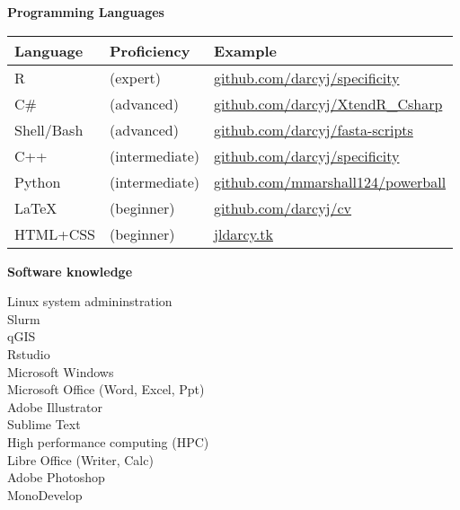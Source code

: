 \documentclass{article}
\begin{document}
{\large  \textbf{Programming Languages}}
\\\begin{tabular}{l l l}
  Language & Proficiency & Example\\
  \hline
  R & (expert) & \href{https://github.com/darcyj/specificity}{github.com/darcyj/specificity}\\
  C\# & (advanced) & \href{https://github.com/darcyj/XtendR_Csharp}{github.com/darcyj/XtendR\_Csharp}\\
  Shell/Bash & (advanced) & \href{https://github.com/darcyj/fasta-scripts}{github.com/darcyj/fasta-scripts}\\
  C++ & (intermediate) & \href{https://github.com/darcyj/specificity}{github.com/darcyj/specificity}\\ 
  Python & (intermediate) & \href{ https://github.com/mmarshall124/powerball}{github.com/mmarshall124/powerball}\\
  \LaTeX & (beginner) & \href{https://github.com/darcyj/cv}{github.com/darcyj/cv}\\
  HTML+CSS & (beginner) & \href{jldarcy.tk}{jldarcy.tk}\\
\end{tabular}

\vspace{3mm}
{\large  \textbf{Software knowledge}}
  \begin{adjustwidth}{2mm}{}\begin{multicols}{3}
    Linux system admininstration\\
    Slurm\\
    qGIS\\
    Rstudio\\
    Microsoft Windows\\
    Microsoft Office (Word, Excel, Ppt)\\
    Adobe Illustrator\\
    Sublime Text\\
    High performance computing (HPC)\\
    Libre Office (Writer, Calc)\\
    Adobe Photoshop\\
    MonoDevelop\\
  \end{multicols}\end{adjustwidth}
\vspace{3mm}
\end{document}
